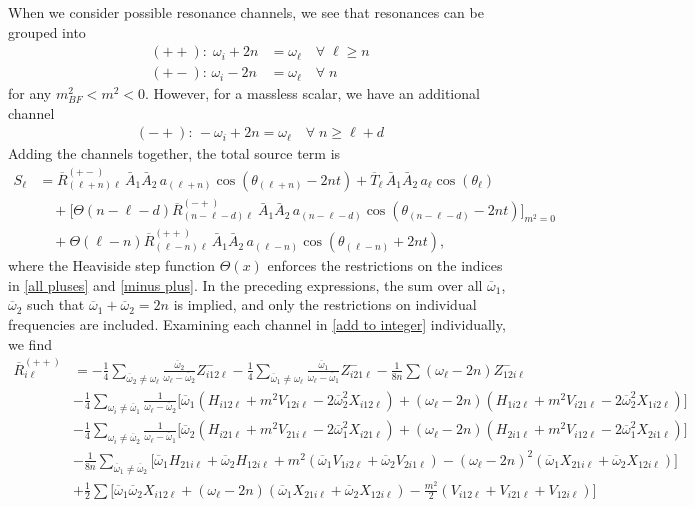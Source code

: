 \documentclass[letterpaper,11pt]{article}
\newcommand{\oi}{\omega_i}
\newcommand{\ol}{\omega_\ell}
\newcommand{\oone}{\overline{\omega}_1}
\newcommand{\otwo}{\overline{\omega}_2}
\begin{document}
When we consider possible resonance channels, we see that resonances can be grouped into
\begin{align}
\label{all pluses}
(++): \; \omega_i + 2n &= \omega_\ell \quad \forall \; \ell \geq n \\
(+-): \, \omega_i - 2n &=\omega_\ell \quad \forall \; n
\end{align}
for any $m^2_{BF} < m^2 < 0$. However, for a massless scalar, we have an additional channel
\begin{align}
\label{minus plus}
(-+): \, -\omega_i + 2n = \omega_\ell \quad \forall \; n \geq \ell + d
\end{align}
Adding the channels together, the total source term is
\begin{align}
\label{add to integer}
S_\ell &=   \overline{R}^{(+-)}_{(\ell + n) \ell} \, \bar A_1 \bar A_2 \, a_{(\ell + n)} \cos\left( \theta_{(\ell + n)} - 2nt \right) + \overline{T}_{\ell} \, \bar A_1 \bar A_2 \, a_\ell \cos \left( \theta_\ell \right) \nonumber \\ 
%
& \quad + \bigg[ \Theta\left( n - \ell - d \right) \overline{R}^{(-+)}_{(n - \ell - d) \ell} \ \bar A_1 \bar A_2 \, a_{(n - \ell - d)} \cos \left( \theta_{(n - \ell - d)} - 2nt \right) \bigg]_{m^2 = 0} \nonumber \\
%
& \quad + \Theta \left( \ell - n \right)  \overline{R}^{(++)}_{(\ell - n)\ell} \, \bar A_1 \bar A_2 \, a_{(\ell - n)} \cos \left( \theta_{(\ell - n)} + 2nt \right) ,
\end{align}
where the Heaviside step function $\Theta(x)$ enforces the restrictions on the indices in \eqref{all pluses} and \eqref{minus plus}. In the preceding expressions, the sum over all $\oone$, $\otwo$ such that $\oone + \otwo = 2n$ is implied, and only the restrictions on individual frequencies are included. Examining each channel in \eqref{add to integer} individually, we find
\begin{align}
\label{R1}
\overline{R}^{(++)}_{i \ell} &= - \frac{1}{4} \sum_{\otwo \neq \ol} \frac{\otwo}{\ol - \otwo} Z^{-}_{i12\ell} - \frac{1}{4} \sum_{\oone \neq \ol} \frac{\oone}{\ol - \oone} Z^{-}_{i21\ell} - \frac{1}{8n} \sum \left( \ol - 2n \right) Z^-_{12i\ell} \nonumber \\
%
& - \frac{1}{4} \sum_{\oi \neq \oone} \frac{1}{\ol - \otwo} \Big[ \oone \left( H_{i12\ell} + m^2 V_{12i\ell} - 2 \otwo^2 X_{i12\ell} \right) + (\ol - 2n) \left( H_{1i2\ell} + m^2 V_{i21\ell} - 2\otwo^2 X_{1i2\ell} \right)\Big] \nonumber \\
%
& - \frac{1}{4} \sum_{\oi \neq \otwo} \frac{1}{\ol - \oone} \Big[ \otwo \left( H_{i21\ell} + m^2 V_{21i\ell} - 2\oone^2 X_{i21\ell} \right) + (\ol - 2n) \left( H_{2i1\ell} + m^2 V_{i12\ell} - 2\oone^2 X_{2i1\ell} \right) \Big] \nonumber \\
%
& - \frac{1}{8n} \sum_{\oone \neq \otwo} \Big[ \oone H_{21i\ell} + \otwo H_{12i\ell} + m^2 \left( \oone V_{1i2\ell} + \otwo V_{2i1\ell} \right) - \left( \ol - 2n \right)^2 \left(\oone X_{21i\ell} + \otwo X_{12i\ell} \right) \Big] \nonumber \\
%
& + \frac{1}{2} \sum \Big[ \oone\otwo X_{i12\ell} + \left( \ol - 2n \right)\left( \oone X_{21i\ell} + \otwo X_{12i\ell} \right) - \frac{m^2}{2} \left( V_{i12\ell} + V_{i21\ell} + V_{12i\ell} \right) \Big]
\end{align}
\end{document}
